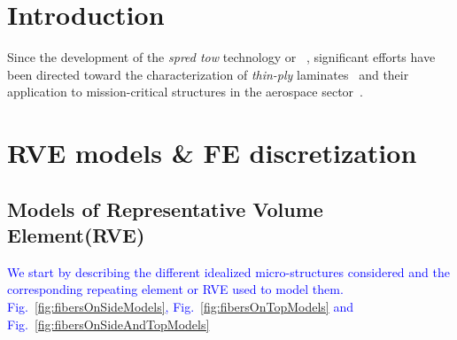 \documentclass[review]{elsarticle}
\begin{document}
\linenumbers

\section{Introduction}

Since the development of the \emph{spred tow} technology or ~\cite{Kawabe2008,Kawabe2008en}, significant efforts have been directed toward the characterization of \emph{thin-ply} laminates~\cite{Sasayama2003,Yamaguchi2005,Tsai2005,Sihn2007,Yokozeki2008,Yokozeki2010,Saito2012,Arteiro2013,Arteiro2014,Amacher2014,Guillamet2014,Huang2018,Cugnoni2018} and their application to mission-critical structures in the aerospace sector~\cite{Moon2011,Kim2017,Kopp2017,McCarville2018}.\\


\section{RVE models \& FE discretization}

\subsection{Models of Representative Volume Element(RVE)}

\textcolor{blue}{We start by describing the different idealized micro-structures considered and the corresponding repeating element or RVE used to model them. Fig.~\ref{fig:fibersOnSideModels}, Fig.~\ref{fig:fibersOnTopModels} and Fig.~\ref{fig:fibersOnSideAndTopModels}}
\end{document}
